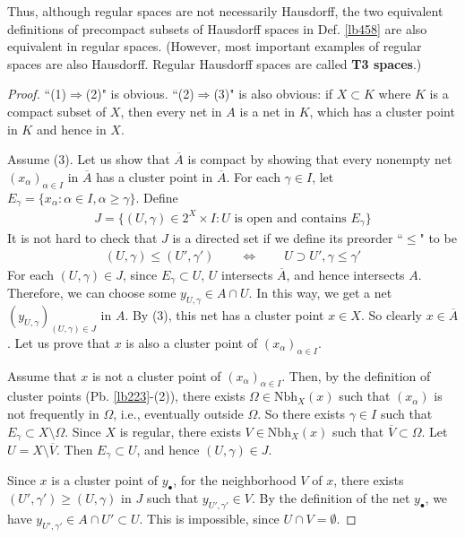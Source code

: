 \documentclass[12pt,b5paper,notitlepage]{article}
\theoremstyle{definition}
\theoremstyle{plain}
\newcommand{\ovl}{\overline}
\newcommand{\blt}{\bullet}
\newcommand{\Nbh}{\mathrm{Nbh}}
\numberwithin{equation}{section}
\begin{document}
Thus, although regular spaces are not necessarily Hausdorff, the two equivalent definitions of precompact subsets of Hausdorff spaces in Def. \ref{lb458} are also equivalent in regular spaces. (However, most important examples of regular spaces are also Hausdorff. Regular Hausdorff spaces are called \textbf{T3 spaces}.) 

\begin{proof}%
``(1)$\Rightarrow$(2)" is obvious. ``(2)$\Rightarrow$(3)" is also obvious: if $X\subset K$ where $K$ is a compact subset of $X$, then every net in $A$ is a net in $K$, which has a cluster point in $K$ and hence in $X$. 

Assume (3). Let us show that $\ovl A$ is compact by showing that every nonempty net $(x_\alpha)_{\alpha\in I}$ in $\ovl A$ has a cluster point in $\ovl A$. 
For each $\gamma\in I$, let $E_\gamma=\{x_\alpha:\alpha\in I,\alpha\geq\gamma\}$. Define 
\begin{align*}
J=\big\{(U,\gamma)\in 2^X\times I:U\text{ is open and contains } E_\gamma \big\}
\end{align*}
It is not hard to check that $J$ is a directed set if we define its preorder ``$\leq$" to be
\begin{align*}
(U,\gamma)\leq(U',\gamma')\qquad\Longleftrightarrow\qquad U\supset U',\gamma\leq \gamma'
\end{align*}
For each $(U,\gamma)\in J$, since $E_\gamma\subset U$, $U$ intersects $\ovl A$, and hence intersects $A$. Therefore, we can choose some $y_{U,\gamma}\in A\cap U$. In this way, we get a net $(y_{U,\gamma})_{(U,\gamma)\in J}$ in $A$. By (3), this net has a cluster point $x\in X$. So clearly $x\in\ovl A$. Let us prove that $x$ is also a cluster point of $(x_\alpha)_{\alpha\in I}$.


Assume that $x$ is not a cluster point of $(x_\alpha)_{\alpha\in I}$. Then, by the definition of cluster points (Pb. \ref{lb223}-(2)), there exists $\Omega\in\Nbh_X(x)$ such that $(x_\alpha)$ is not frequently in $\Omega$, i.e., eventually outside $\Omega$. So there exists $\gamma\in I$ such that $E_\gamma\subset X\setminus \Omega$. Since $X$ is regular, there exists $V\in\Nbh_X(x)$ such that $\ovl V\subset \Omega$. Let $U=X\setminus \ovl V$. Then $E_\gamma\subset U$, and hence $(U,\gamma)\in J$.

Since $x$ is a cluster point of $y_\blt$, for the neighborhood $V$ of $x$, there exists $(U',\gamma')\geq (U,\gamma)$ in $J$ such that $y_{U',\gamma'}\in V$. By the definition of the net $y_\blt$, we have $y_{U',\gamma'}\in A\cap U'\subset U$. This is impossible, since $U\cap V=\emptyset$.
\end{proof}
\end{document}
